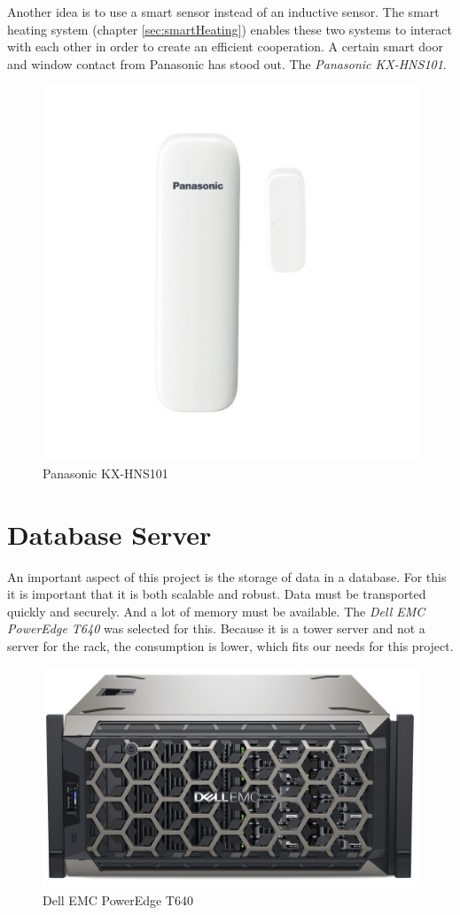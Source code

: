 Another idea is to use a smart sensor instead of an inductive sensor. The smart heating system (chapter \ref{sec:smartHeating}) enables these two systems to interact with each other in order to create an efficient cooperation. A certain smart door and window contact from Panasonic has stood out. The \textit{Panasonic KX-HNS101}.
\newpage
\begin{figure}[h]
	\centering
	\includegraphics[width=.4\textwidth]{images/CostAnalysis/panasonicfensterkontakt} 
	\caption[Panasonic KX-HNS101]{Panasonic KX-HNS101\footnotemark}
	\label{fig:panasonicSmart}
\end{figure}
\section{Database Server}
An important aspect of this project is the storage of data in a database. For this it is important that it is both scalable and robust. Data must be transported quickly and securely. And a lot of memory must be available. The \textit{Dell EMC PowerEdge T640} was selected for this. Because it is a tower server and not a server for the rack, the consumption is lower, which fits our needs for this project.
\newpage
\begin{figure}[h]
	\centering
	\includegraphics[width=.6\textwidth]{images/CostAnalysis/DellEMCPowerEdgeT640} 
	\caption[Dell EMC PowerEdge T640]{Dell EMC PowerEdge T640\footnotemark}
	\label{fig:dbServer}
\end{figure}
